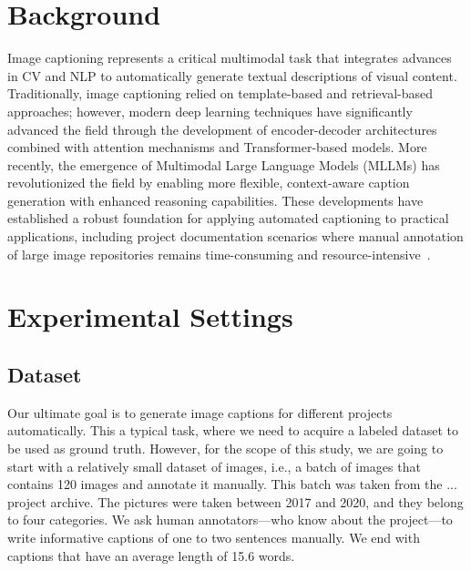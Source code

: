 \documentclass[runningheads]{llncs}
\begin{document}
\section{Background}
\label{sec:related_work}

Image captioning represents a critical multimodal task that integrates advances in CV and NLP to automatically generate textual descriptions of visual content. Traditionally, image captioning relied on template-based and retrieval-based approaches; however, modern deep learning techniques have significantly advanced the field through the development of encoder-decoder architectures combined with attention mechanisms and Transformer-based models. More recently, the emergence of Multimodal Large Language Models (MLLMs) has revolutionized the field by enabling more flexible, context-aware caption generation with enhanced reasoning capabilities. These developments have established a robust foundation for applying automated captioning to practical applications, including project documentation scenarios where manual annotation of large image repositories remains time-consuming and resource-intensive~\cite{Abdulgalil2025ImageCaptioningSurvey}.

\section{Experimental Settings}

\subsection{Dataset}
Our ultimate goal is to generate image captions for different projects automatically. This a typical task, where we need to acquire a labeled dataset to be used as ground truth. However, for the scope of this study, we are going to start with a relatively small dataset of images, i.e., a batch of images that contains 120 images and annotate it manually. This batch was taken from the ... project archive. The pictures were taken between 2017 and 2020, and they belong to four categories.  We ask human annotators—who know about the project—to write informative captions of one to two sentences manually. We end with captions that have an average length of 15.6 words.
\end{document}
